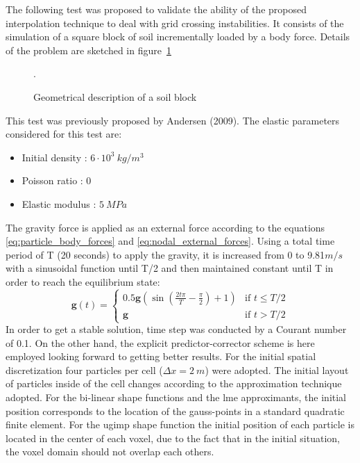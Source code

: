 \documentclass[preprint,12pt,a4paper]{elsarticle}
\begin{document}
The following test was proposed to validate the ability of the proposed
interpolation technique to deal with grid crossing instabilities. It
consists of the simulation of a square block of soil incrementally
loaded by a body force. Details of the problem are sketched in figure~\ref{fig:block}
\begin{figure}\sidecaption
  \centering
  \resizebox{0.7\hsize}{!}{
    }
  \caption{Geometrical description of a soil block }.
  \label{fig:block}
\end{figure}
This test was previously proposed by Andersen (2009)\cite{thesis_Andersen_2009}. The
elastic parameters considered for this test are: 
\begin{itemize} 
\item  Initial density : $6\cdot 10^3\ kg/m^3$
\item  Poisson ratio : $0$
\item  Elastic modulus : $5\ MPa$
\end{itemize}
The gravity force is applied as an external force according to the
equations \eqref{eq:particle_body_forces} and
\eqref{eq:nodal_external_forces}. Using a total time period of T (20
seconds) to apply the gravity, it is increased from 0 to 9.81$m/s$
with a sinusoidal function until T/2 and then maintained constant until T
in order to reach the equilibrium state:
\begin{equation}
  \label{eq:gravity-load-block}
 \mathbf{g}(t) = \left\{
    \begin{array}{ll}
      0.5 \mathbf{g} (\sin(\frac{2t \pi}{T} - \frac{\pi}{2})+1)  & \mbox{if } t \leq T/2 \\
      \mathbf{g} & \mbox{if } t > T/2
    \end{array}
  \right.
\end{equation}
In order to get a stable solution, time step was conducted by a
Courant number of 0.1. On the other hand, the explicit
predictor-corrector scheme is here employed looking forward to getting better results. For the
initial spatial discretization four particles per cell
($\Delta x = 2\ m$) were adopted. The initial layout of particles inside of the
cell changes according to the approximation technique adopted. For the
bi-linear shape functions and the \acrshort{lme} approximants, the initial
position corresponds to the location of the gauss-points in a standard
quadratic finite element. For the \acrshort{ugimp} shape function the initial
position of each particle is located in the center of each voxel, due
to the fact that in the initial situation, the voxel domain should not
overlap each others.
\end{document}
